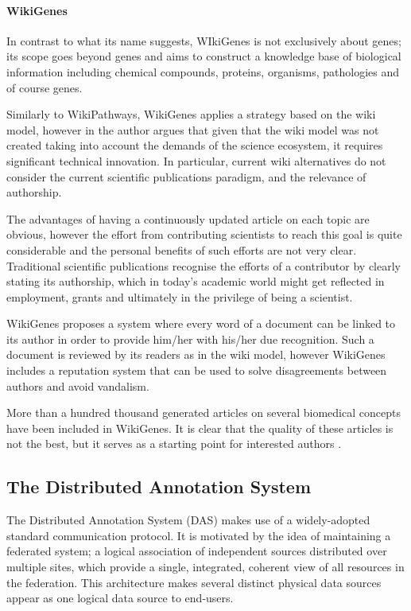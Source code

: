 \paragraph{WikiGenes}
In contrast to what its name suggests, WIkiGenes is not exclusively about genes; its scope goes beyond genes and aims to construct a knowledge base of biological information including chemical compounds, proteins, organisms, pathologies and of course genes. 

Similarly to WikiPathways, WikiGenes applies a strategy based on the wiki model, however in \cite{HOF2008} the author argues that given that the wiki model was not created taking into account the demands of the science ecosystem, it requires significant technical innovation. In particular, current wiki alternatives do not consider the current scientific publications paradigm, and the relevance of authorship. 

The advantages of having a continuously updated article on each topic are obvious, however the effort from contributing scientists to reach this goal is quite considerable and the personal benefits of such efforts are not very clear. Traditional scientific publications recognise the efforts of a contributor by clearly stating its authorship, which in today's academic world might get reflected in employment, grants and ultimately in the privilege of being a scientist.

WikiGenes proposes a system where every word of a document can be linked to its author in order to provide him/her with his/her due recognition. Such a document is reviewed by its readers as in the wiki model, however WikiGenes includes a reputation system that can be used to solve disagreements between authors and avoid vandalism.

More than a hundred thousand generated articles on several biomedical concepts have been included in WikiGenes. It is clear that the quality of these articles is not the best, but it serves as a starting point for interested authors \cite{HOF2008}.


\subsection{The Distributed Annotation System}
The Distributed Annotation System (DAS) \cite{DOW2001} makes use of a widely-adopted standard communication protocol. It is motivated by the idea of maintaining a federated system; a logical association of independent sources distributed over multiple sites, which provide a single, integrated, coherent view of all resources in the federation. This architecture makes several distinct physical data sources appear as one logical data source to end-users. 

